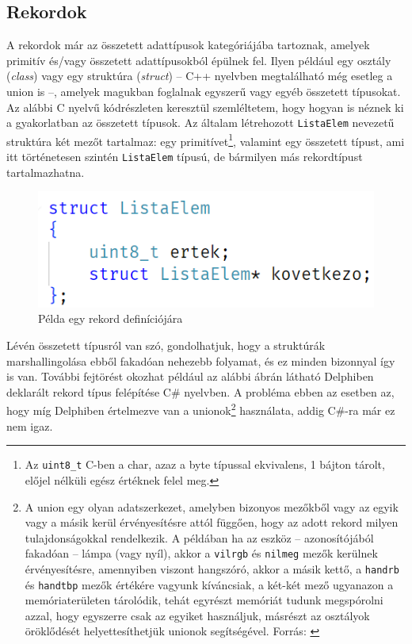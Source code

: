 \documentclass[tocnopagenum]{thesis-ekf}
\begin{document}
	\subsection{Rekordok}
	A rekordok már az összetett adattípusok kategóriájába tartoznak, amelyek primitív és/vagy összetett adattípusokból épülnek fel. Ilyen például egy osztály (\textit{class}) vagy egy struktúra (\textit{struct}) -- C++ nyelvben megtalálható még esetleg a union is --, amelyek magukban foglalnak egyszerű vagy egyéb összetett típusokat.
	Az alábbi C nyelvű kódrészleten keresztül szemléltetem, hogy hogyan is néznek ki a gyakorlatban az összetett típusok. Az általam létrehozott \verb*|ListaElem| nevezetű struktúra két mezőt tartalmaz: egy primitívet\footnote{Az \verb*|uint8_t| C-ben a char, azaz a byte típussal ekvivalens, 1 bájton tárolt, előjel nélküli egész értéknek felel meg.}, valamint egy összetett típust, ami itt történetesen szintén \verb*|ListaElem| típusú, de bármilyen más rekordtípust tartalmazhatna.
	\begin{figure}[h!]
		\centering
		\includegraphics[scale=0.5]{linkedlist_struct}
		\caption{Példa egy rekord definíciójára}
		\label{fig:linkedlist_struct}
	\end{figure}
	
	Lévén összetett típusról van szó, gondolhatjuk, hogy a struktúrák marshallingolása ebből fakadóan nehezebb folyamat, és ez minden bizonnyal így is van. További fejtörést okozhat például az alábbi ábrán látható Delphiben deklarált rekord típus felépítése C\# nyelvben. A probléma ebben az esetben az, hogy míg Delphiben értelmezve van a unionok\footnote{A union egy olyan adatszerkezet, amelyben bizonyos mezőkből vagy az egyik vagy a másik kerül érvényesítésre attól függően, hogy az adott rekord milyen tulajdonságokkal rendelkezik. A példában ha az eszköz -- azonosítójából fakadóan -- lámpa (vagy nyíl), akkor a \verb*|vilrgb| és \verb*|nilmeg| mezők kerülnek érvényesítésre, amennyiben viszont hangszóró, akkor a másik kettő, a \verb*|handrb| és \verb*|handtbp| mezők értékére vagyunk kíváncsiak, a két-két mező ugyanazon a memóriaterületen tárolódik, tehát egyrészt memóriát tudunk megspórolni azzal, hogy egyszerre csak az egyiket használjuk, másrészt az osztályok öröklődését helyettesíthetjük unionok segítségével. Forrás: \cite{jsorber_unions}} használata, addig C\#-ra már ez nem igaz.
	
\end{document}

